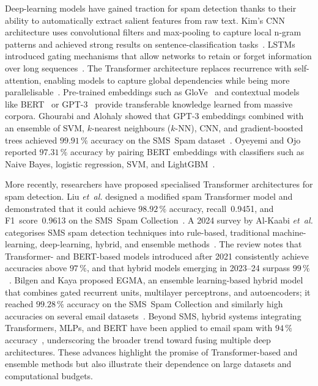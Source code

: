 \documentclass[conference]{IEEEtran}
\begin{document}
Deep-learning models have gained traction for spam detection thanks to their ability to automatically extract salient features from raw text. Kim's CNN architecture uses convolutional filters and max-pooling to capture local n-gram patterns and achieved strong results on sentence-classification tasks~\cite{kim2014}. LSTMs introduced gating mechanisms that allow networks to retain or forget information over long sequences~\cite{hochreiter1997}. The Transformer architecture replaces recurrence with self-attention, enabling models to capture global dependencies while being more parallelisable~\cite{vaswani2017}. Pre-trained embeddings such as GloVe~\cite{pennington2014} and contextual models like BERT~\cite{devlin2019} or GPT-3~\cite{brown2020} provide transferable knowledge learned from massive corpora. Ghourabi and Alohaly showed that GPT-3 embeddings combined with an ensemble of SVM, $k$-nearest neighbours ($k$-NN), CNN, and gradient-boosted trees achieved $99.91\,\%$ accuracy on the SMS~Spam dataset~\cite{ghourabi2023}. Oyeyemi and Ojo reported $97.31\,\%$ accuracy by pairing BERT embeddings with classifiers such as Naive Bayes, logistic regression, SVM, and LightGBM~\cite{oyeyemi2023}.

More recently, researchers have proposed specialised Transformer architectures for spam detection. Liu \emph{et~al.} designed a modified spam Transformer model and demonstrated that it could achieve $98.92\,\%$ accuracy, recall~0.9451, and F1~score~0.9613 on the SMS~Spam Collection~\cite{liu2021}. A 2024 survey by Al-Kaabi \emph{et~al.} categorises SMS spam detection techniques into rule-based, traditional machine-learning, deep-learning, hybrid, and ensemble methods~\cite{alkaabi2024}. The review notes that Transformer- and BERT-based models introduced after 2021 consistently achieve accuracies above $97\,\%$, and that hybrid models emerging in 2023--24 surpass $99\,\%$~\cite{alkaabi2024}. Bilgen and Kaya proposed EGMA, an ensemble learning-based hybrid model that combines gated recurrent units, multilayer perceptrons, and autoencoders; it reached $99.28\,\%$ accuracy on the SMS~Spam Collection and similarly high accuracies on several email datasets~\cite{bilgen2024}. Beyond SMS, hybrid systems integrating Transformers, MLPs, and BERT have been applied to email spam with $94\,\%$ accuracy~\cite{kmail2025}, underscoring the broader trend toward fusing multiple deep architectures. These advances highlight the promise of Transformer-based and ensemble methods but also illustrate their dependence on large datasets and computational budgets.
\end{document}
